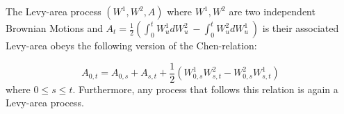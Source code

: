 \documentclass[a4paper,12pt]{article}
\begin{document}
The Levy-area process \( (W^1,W^2,A) \) where \( W^1, W^2 \) are two independent Brownian Motions and \( A_t = \frac{1}{2} \left( \int_0^t W^1_u dW^2_u\ - \int_0^t W^2_u dW^1_u\ \right) \) is their associated Levy-area obeys the following version of the Chen-relation:

\[ A_{0,t} = A_{0,s} + A_{s,t} + \frac{1}{2}\left( W^1_{0,s} W^2_{s,t} - W^2_{0,s} W^1_{s,t} \right)  \]
where \( 0 \leq s \leq t \). Furthermore, any process that follows this relation is again a Levy-area process.
\end{document}
